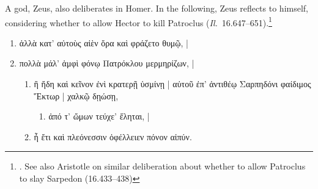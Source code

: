 \documentclass[12pt,letterpaper,oneside,final]{memoir}
\begin{document}
A god, Zeus, also deliberates in Homer. In the following, Zeus reflects to himself, considering whether to allow Hector to kill Patroclus (\emph{Il.}~16.647--651).\footnote{. See also Aristotle on similar deliberation about whether to allow Patroclus to slay Sarpedon (16.433--438)} \begin{greek} \begin{enumerate} \SingleSpacing
\item ἀλλὰ κατ' αὐτοὺς αἰὲν ὅρα καὶ φράζετο θυμῷ, |
\item πολλὰ μάλ' ἀμφὶ φόνῳ Πατρόκλου μερμηρίζων, |
  \begin{enumerate}
  \item ἢ ἤδη καὶ κεῖνον ἐνὶ κρατερῇ ὑσμίνῃ |
αὐτοῦ ἐπ' ἀντιθέῳ Σαρπηδόνι φαίδιμος Ἕκτωρ |
χαλκῷ δῃώσῃ, 
    \begin{enumerate}
    \item ἀπό τ' ὤμων τεύχε' ἕληται, |
    \end{enumerate}
  \item ἦ ἔτι καὶ πλεόνεσσιν ὀφέλλειεν πόνον αἰπύν. 
  \end{enumerate} 

\end{enumerate}
\end{greek}
\end{document}
